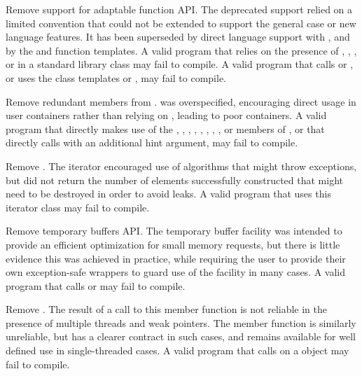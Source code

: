 \nodiffref
\change
Remove support for adaptable function API.
\rationale
The deprecated support relied on a limited convention that could not be
extended to support the general case or new language features. It has been
superseded by direct language support with , and by the
 and  function templates.
\effect
A valid \CppXVII{} program that relies on the presence of ,
, , or
 in a standard library class may fail to compile. A
valid \CppXVII{} program that calls  or , or uses the
class templates  or , may fail to
compile.

\nodiffref
\change
Remove redundant members from .
\rationale
{} was overspecified, encouraging direct usage in user containers
rather than relying on , leading to poor containers.
\effect
A valid \CppXVII{} program that directly makes use of the ,
, , ,
, , , , or
 members of , or that directly calls
 with an additional hint argument, may fail to compile.

\nodiffref
\change
Remove .
\rationale
The iterator encouraged use of algorithms that might throw exceptions, but did
not return the number of elements successfully constructed that might need to
be destroyed in order to avoid leaks.
\effect
A valid \CppXVII{} program that uses this iterator class may fail to compile.

\nodiffref
\change
Remove temporary buffers API.
\rationale
The temporary buffer facility was intended to provide an efficient optimization
for small memory requests, but there is little evidence this was achieved in
practice, while requiring the user to provide their own exception-safe wrappers
to guard use of the facility in many cases.
\effect
A valid \CppXVII{} program that calls  or
 may fail to compile.

\nodiffref
\change
Remove .
\rationale
The result of a call to this member function is not reliable in the presence of
multiple threads and weak pointers. The member function  is
similarly unreliable, but has a clearer contract in such cases, and remains
available for well defined use in single-threaded cases.
\effect
A valid \CppXVII{} program that calls  on a 
object may fail to compile.

